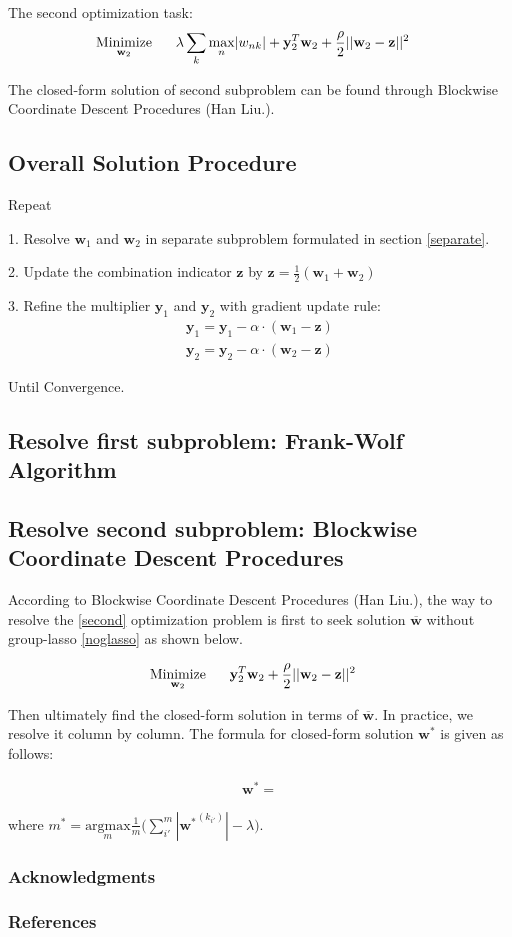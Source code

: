 \documentclass{article} %
\newcommand{\argmax}[1]{\underset{#1}{\text{argmax} }}
\newcommand{\LTwoNorm}[1]{||#1||^{2}}
\newcommand{\sumk}{\sum_{k}}
\newcommand{\wnk}{w_{nk}}
\newcommand{\wone}{\mathbf{w}_1}
\newcommand{\wtwo}{\mathbf{w}_2}
\newcommand{\w}{\mathbf{w}}
\newcommand{\wbar}{\overline{\w}}
\newcommand{\wopt}{\mathbf{w^{*}}}
\newcommand{\maxn}{ \underset{n}{\text{max}} }
\newcommand{\yone}{\mathbf{y}_1}
\newcommand{\ytwo}{\mathbf{y}_2}
\newcommand{\z}{\mathbf{z}}
\newcommand{\quadraterm}[1]{\frac{\rho}{2}\LTwoNorm{\w_{#1}-\z}}
\newcommand{\minimize}[1]{ \underset{#1}{\text{Minimize}} }
\newcommand{\hs}{\hspace*{0.6cm}}
\begin{document}
 The second optimization task:
 \begin{align} \label{second}
   \minimize{\wtwo}
   \hs & \lambda \sumk \maxn | \wnk |  %
   + \mutw{2} + \quadraterm{2} 
 \end{align}

 The closed-form solution of second subproblem can be found through Blockwise
 Coordinate Descent Procedures (Han Liu.). 

\subsection{Overall Solution Procedure}
Repeat

1. Resolve $\wone$ and $\wtwo$ in separate subproblem formulated in section
\ref{separate}.

2. Update the combination indicator $\z$ by $\z = \frac{1}{2} (\wone + \wtwo)$

3. Refine the multiplier $\yone$ and $\ytwo$ with gradient update rule: 
\begin{align}
\yone = \yone - \alpha \cdot (\wone - \z) \\
\ytwo = \ytwo - \alpha \cdot (\wtwo - \z)
\end{align}

Until Convergence.

\subsection{Resolve first subproblem: Frank-Wolf Algorithm} 


\subsection{Resolve second subproblem: Blockwise Coordinate Descent Procedures} 
According to Blockwise Coordinate Descent Procedures (Han Liu.), the way to
resolve the \eqref{second} optimization problem is first to seek solution $\wbar$ without
group-lasso \eqref{noglasso} as shown below. 

\begin{align} \label{noglasso}
   \minimize{\wtwo}
   \hs & \mutw{2} + \quadraterm{2} 
 \end{align}

\newcommand{\ms}{m^{*}}
Then ultimately find the closed-form solution in terms of $\wbar$. In
practice, we resolve it column by column. The formula for closed-form
solution $\wopt$ is given as follows:

\begin{align}
    \wopt = 
\end{align}

where $\ms = \argmax{m} \frac{1}{m} \big(\sum_{i'}^{m} |\wopt^{(k_{i'})}| -
\lambda \big)$.

\subsubsection*{Acknowledgments}

\subsubsection*{References}
\small{

}
\end{document}
